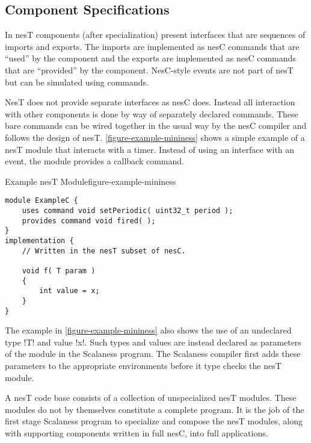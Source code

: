 \subsection{Component Specifications}
\label{section-component-specifications}

In nesT components (after specialization) present interfaces that are sequences of imports and
exports. The imports are implemented as nesC commands that are ``used'' by the component and the
exports are implemented as nesC commands that are ``provided'' by the component. NesC-style
events are not part of nesT but can be simulated using commands.


NesT does not provide separate interfaces as nesC does. Instead all interaction with other
components is done by way of separately declared commands. These bare commands can be wired
together in the usual way by the nesC compiler \cite{Gay-nesC-2003} and follows the design of
nesT. \autoref{figure-example-mininess} shows a simple example of a nesT module that interacts
with a timer. Instead of using an interface with an event, the module provides a callback
command.

\singlespace
\begin{fpfig}[tbhp]{Example nesT Module}{figure-example-mininess}
{
\begin{lstlisting}[language=nesC]
module ExampleC {
    uses command void setPeriodic( uint32_t period );
    provides command void fired( );
}
implementation {
    // Written in the nesT subset of nesC.

    void f( T param )
    {
        int value = x;
    }
}
\end{lstlisting}
}
\end{fpfig}
\primaryspacing

The example in \autoref{figure-example-mininess} also shows the use of an undeclared type !T!
and value !x!. Such types and values are instead declared as parameters of the module in the
Scalaness program. The Scalaness compiler first adds these parameters to the appropriate
environments before it type checks the nesT module.

A nesT code base consists of a collection of unspecialized nesT modules. These modules do not by
themselves constitute a complete program. It is the job of the first stage Scalaness program to
specialize and compose the nesT modules, along with supporting components written in full nesC,
into full applications.

